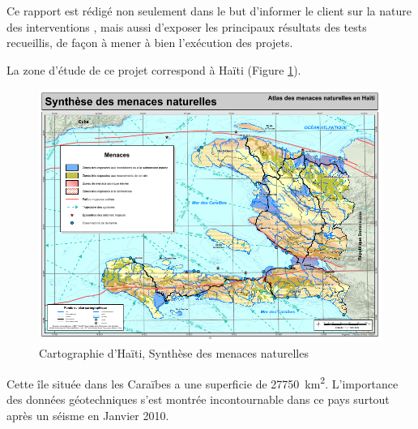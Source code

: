Ce rapport est rédigé non seulement dans le but d’informer le client sur la nature des interventions
, mais aussi d’exposer les principaux résultats des tests recueillis, de façon à mener à bien
l’exécution des projets.
\par
La zone d'étude de ce projet correspond à Haïti (Figure \ref{fig:haiti}).
\begin{figure}
    \centering
    \includegraphics[width=1\textwidth]{images/Contexte/haiti.png}
    \caption{Cartographie d'Haïti, Synthèse des menaces naturelles  \cite{ciat}}
    \label{fig:haiti}
\end{figure}
Cette île située dans les Caraïbes a une superficie de  \SI{27750}{\kilo\metre\squared}.
L'importance des données géotechniques s'est montrée incontournable dans ce pays surtout 
après un séisme en Janvier 2010.

